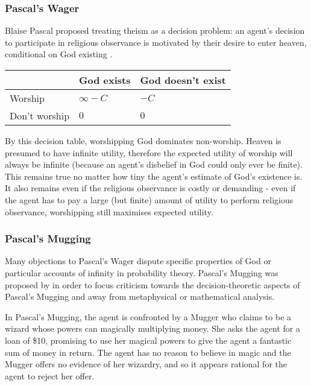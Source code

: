 \documentclass{article}
\begin{document}
\subsubsection {Pascal's Wager}

Blaise Pascal proposed treating theism as a decision problem: an agent's decision to participate in religious observance is motivated by their desire to enter heaven, conditional on God existing \citep{pascal1852pensees}.

\begin{center}
\begin{tabular}{ | l | l | l |}
  \hline
    & God exists & God doesn't exist \\ \hline
  Worship & \(\infty - C\) & \(- C\) \\ \hline
  Don't worship & \(0\)  & \(0\) \\
  \hline
\end{tabular}
\end{center}

By this decision table, worshipping God dominates non-worship. Heaven is presumed to have infinite utility, therefore the expected utility of worship will always be infinite (because an agent's disbelief in God could only ever be finite). This remains true no matter how tiny the agent's estimate of God's existence is. It also remains even if the religious observance is costly or demanding - even if the agent has to pay a large (but finite) amount of utility to perform religious observance, worshipping still maximises expected utility.

\subsubsection {Pascal's Mugging}
Many objections to Pascal's Wager dispute specific properties of God or  particular accounts of infinity in probability theory. Pascal's Mugging was proposed by \citep{bostrom2009pascal} in order to focus criticism towards the decision-theoretic aspects of Pascal's Mugging and away from metaphysical or mathematical analysis.

In Pascal's Mugging, the agent is confronted by a Mugger who claims to be a wizard whose powers can magically multiplying money. She asks the agent for a loan of \$10, promising to use her magical powers to give the agent a fantastic sum of money in return. The agent has no reason to believe in magic and the Mugger offers no evidence of her wizardry, and so it appears rational for the agent to reject her offer.
\end{document}
